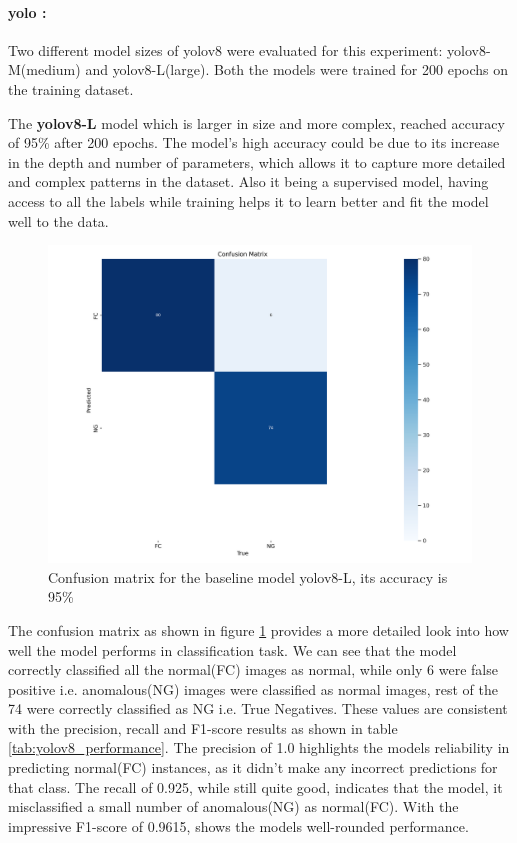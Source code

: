 \paragraph*{\gls{yolo} : }Two different model sizes of \gls{yolo}v8 \cite{Ultralytics2024} were evaluated for this experiment: \gls{yolo}v8-M(medium) and \gls{yolo}v8-L(large). Both the models were trained for 200 epochs on the training dataset.

The \textbf{\gls{yolo}v8-L} model which is larger in size and more complex, reached accuracy of 95\% after 200 epochs. The model's high accuracy could be due to its increase in the depth and number of parameters, which allows it to capture more detailed and complex patterns in the dataset. Also it being a supervised model, having access to all the labels while training helps it to learn better and fit the model well to the data.

\begin{figure}
    \centering
    \includegraphics[width=1.3\linewidth]{Rohit_Master_Thesis//Images/yolov8l_confusion_matrix.png}
    \caption{Confusion matrix for the baseline model \gls{yolo}v8-L, its accuracy is 95\%}
    \label{fig:yolov8l confusion matrix}
\end{figure}

The confusion matrix as shown in figure \ref{fig:yolov8l confusion matrix} provides a more detailed look into how well the model performs in classification task. We can see that the model correctly classified all the normal(FC) images as normal, while only 6 were false positive i.e. anomalous(NG) images were classified as normal images, rest of the 74 were correctly classified as NG i.e. True Negatives. These values are consistent with the precision, recall and F1-score results as shown in table \ref{tab:yolov8_performance}. The precision of 1.0 highlights the models reliability in predicting normal(FC) instances, as it didn't make any incorrect predictions for that class. The recall of 0.925, while still quite good, indicates that the model, it misclassified a small number of anomalous(NG) as normal(FC). With the impressive F1-score of 0.9615, shows the models well-rounded performance.

